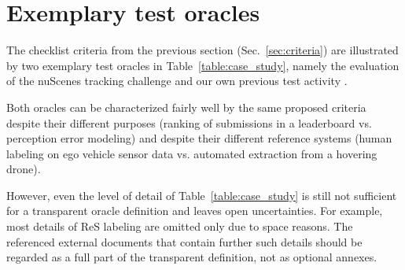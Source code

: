 \documentclass[conference]{IEEEtran}
\begin{document}
\section{Exemplary test oracles}
\label{sec:case_studies}


The checklist criteria from the previous section (Sec.~\ref{sec:criteria}) are illustrated by two exemplary test oracles in Table~\ref{table:case_study}, namely the evaluation of the nuScenes tracking challenge \cite{caesar2019nuscenes} and our own previous test activity \cite{Krajewski2020UsingDrones}. 


Both oracles can be characterized fairly well by the same proposed criteria despite their different purposes (ranking of submissions in a leaderboard vs. perception error modeling) and despite their different reference systems (human labeling on ego vehicle sensor data vs. automated extraction from a hovering drone).


However, even the level of detail of Table~\ref{table:case_study} is still not sufficient for a transparent oracle definition and leaves open uncertainties. %
For example, most details of ReS labeling are omitted only due to space reasons. 
The referenced external documents that contain further such details should be regarded as a full part of the transparent definition, not as optional annexes.




\end{document}

